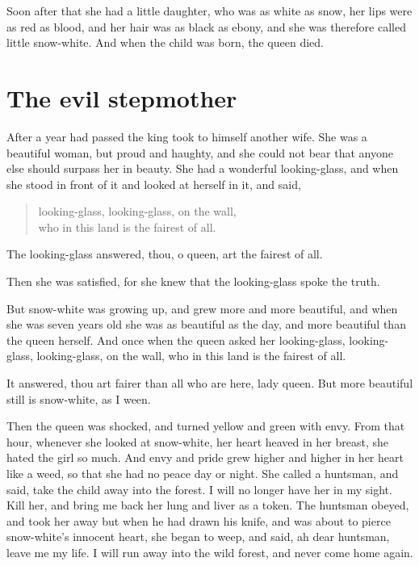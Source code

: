 \documentclass[a4paper,11pt]{article}
\begin{document}
Soon after that she had a little daughter, who was as white as
snow, her lips were as red as blood, and her hair was as black as ebony,
and she was therefore called little snow-white.  And when the
child was born, the queen died.

\section{The evil stepmother}

After a year had passed the king took to himself another wife.
She was a beautiful woman, but proud and haughty, and she could
not bear that anyone else should surpass her in beauty.  She
had a wonderful looking-glass, and when she stood in front of it
and looked at herself in it, and said,
\begin{quote}
          looking-glass, looking-glass, on the wall,\\
          who in this land is the fairest of all.
\end{quote}

The looking-glass answered,
          thou, o queen, art the fairest of all.

Then she was satisfied, for she knew that the looking-glass spoke
the truth.

But snow-white was growing up, and grew more and more beautiful,
and when she was seven years old she was as beautiful as the day,
and more beautiful than the queen herself.  And once when the
queen asked her looking-glass,
          looking-glass, looking-glass, on the wall,
          who in this land is the fairest of all.

It answered,
          thou art fairer than all who are here, lady queen.
          But more beautiful still is snow-white, as I ween.

Then the queen was shocked, and turned yellow and green with
envy.  From that hour, whenever she looked at snow-white, her
heart heaved in her breast, she hated the girl so much.
And envy and pride grew higher and higher in her heart like a
weed, so that she had no peace day or night.  She called a
huntsman, and said, take the child away into the forest.  I will
no longer have her in my sight.  Kill her, and bring me back her
lung and liver as a token.  The huntsman obeyed, and took her away
but when he had drawn his knife, and was about to pierce
snow-white's innocent heart, she began to weep, and said, ah dear
huntsman, leave me my life.  I will run away into the wild forest,
and never come home again.
\end{document}
